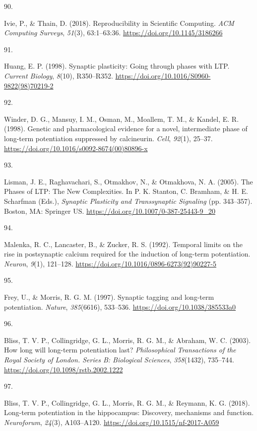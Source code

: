 \documentclass[
  11pt,
  letterpaper,
]{scrreprt}
\newlength{\cslhangindent}
\newlength{\csllabelwidth}
\newenvironment{CSLReferences}[2] %
 {\begin{list}{}{%
  \setlength{\itemindent}{0pt}
  \setlength{\leftmargin}{0pt}
  \setlength{\parsep}{0pt}
  \ifodd #1
   \setlength{\leftmargin}{\cslhangindent}
   \setlength{\itemindent}{-1\cslhangindent}
  \fi
  \setlength{\itemsep}{#2\baselineskip}}}
 {\end{list}}
\newcommand{\CSLLeftMargin}[1]{\parbox[t]{\csllabelwidth}{\strut#1\strut}}
\newcommand{\CSLRightInline}[1]{\parbox[t]{\linewidth - \csllabelwidth}{\strut#1\strut}}
\begin{document}
\begin{CSLReferences}{0}{0}
\CSLLeftMargin{90. }%
\CSLRightInline{Ivie, P., \& Thain, D. (2018). Reproducibility in
{Scientific Computing}. \emph{ACM Computing Surveys}, \emph{51}(3),
63:1--63:36. \url{https://doi.org/10.1145/3186266}}

\CSLLeftMargin{91. }%
\CSLRightInline{Huang, E. P. (1998). Synaptic plasticity: {Going}
through phases with {LTP}. \emph{Current Biology}, \emph{8}(10),
R350--R352. \url{https://doi.org/10.1016/S0960-9822(98)70219-2}}

\CSLLeftMargin{92. }%
\CSLRightInline{Winder, D. G., Mansuy, I. M., Osman, M., Moallem, T. M.,
\& Kandel, E. R. (1998). Genetic and pharmacological evidence for a
novel, intermediate phase of long-term potentiation suppressed by
calcineurin. \emph{Cell}, \emph{92}(1), 25--37.
\url{https://doi.org/10.1016/s0092-8674(00)80896-x}}

\CSLLeftMargin{93. }%
\CSLRightInline{Lisman, J. E., Raghavachari, S., Otmakhov, N., \&
Otmakhova, N. A. (2005). The {Phases} of {LTP}: {The New Complexities}.
In P. K. Stanton, C. Bramham, \& H. E. Scharfman (Eds.), \emph{Synaptic
{Plasticity} and {Transsynaptic Signaling}} (pp. 343--357). Boston, MA:
Springer US. \url{https://doi.org/10.1007/0-387-25443-9_20}}

\CSLLeftMargin{94. }%
\CSLRightInline{Malenka, R. C., Lancaster, B., \& Zucker, R. S. (1992).
Temporal limits on the rise in postsynaptic calcium required for the
induction of long-term potentiation. \emph{Neuron}, \emph{9}(1),
121--128. \url{https://doi.org/10.1016/0896-6273(92)90227-5}}

\CSLLeftMargin{95. }%
\CSLRightInline{Frey, U., \& Morris, R. G. M. (1997). Synaptic tagging
and long-term potentiation. \emph{Nature}, \emph{385}(6616), 533--536.
\url{https://doi.org/10.1038/385533a0}}

\CSLLeftMargin{96. }%
\CSLRightInline{Bliss, T. V. P., Collingridge, G. L., Morris, R. G. M.,
\& Abraham, W. C. (2003). How long will long-term potentiation last?
\emph{Philosophical Transactions of the Royal Society of London. Series
B: Biological Sciences}, \emph{358}(1432), 735--744.
\url{https://doi.org/10.1098/rstb.2002.1222}}

\CSLLeftMargin{97. }%
\CSLRightInline{Bliss, T. V. P., Collingridge, G. L., Morris, R. G. M.,
\& Reymann, K. G. (2018). Long-term potentiation in the hippocampus:
Discovery, mechanisms and function. \emph{Neuroforum}, \emph{24}(3),
A103--A120. \url{https://doi.org/10.1515/nf-2017-A059}}


\end{CSLReferences}
\end{document}

